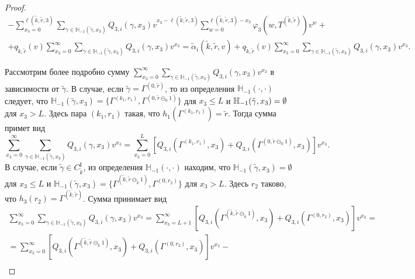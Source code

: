 \documentclass{report}
\begin{document}
\begin{proof}
\begin{multline}
-\sum_{x_3=0}^{\ell(\tilde{k},\tilde{r},3)}  \sum_{\gamma \in {\mathbb H}_{-1}(\tilde{\gamma},x_3)} Q_{3,i}(\gamma,x_3) v^{x_3-\ell(\tilde{k},\tilde{r},3)}   \sum_{w=0}^{\ell(\tilde{k},\tilde{r},3) -x_3}
\varphi_3(w,T^{(\tilde{k},\tilde{r})}) v^w   +\\
+ q_{\tilde{k},\tilde{r}}(v) \sum_{x_3=0}^{\infty} \sum_{\gamma \in {\mathbb H}_{-1}(\tilde{\gamma},x_3)} Q_{3,i}(\gamma,x_3) v^{x_3} = \tilde{\alpha}_i(\tilde{k},\tilde{r},v) + q_{\tilde{k},\tilde{r}}(v) \sum_{x_3=0}^{\infty} \sum_{\gamma \in {\mathbb H}_{-1}(\tilde{\gamma},x_3)} Q_{3,i}(\gamma,x_3) v^{x_3}.
\label{rekur:general:second}
\end{multline}

Рассмотрим более подробно сумму $\sum_{x_3=0}^{\infty} \sum_{\gamma \in {\mathbb H}_{-1}(\tilde{\gamma},x_3)} Q_{3,i}(\gamma,x_3) v^{x_3}$ в зависимости от $\tilde{\gamma}$.
В случае, если $\tilde{\gamma} = \Gamma^{(0,\tilde{r})}$, то из определения ${\mathbb H}_{-1}(\cdot,\cdot)$ следует, что ${\mathbb H}_{-1}(\tilde{\gamma},x_3) = \{\Gamma^{(k_1,r_1)}, \Gamma^{(0,\tilde{r}\ominus_0 1)}\}$ для $x_3 \leqslant L$ и
${\mathbb H}_{-1}(\tilde{\gamma},x_3) \hm=\emptyset$ для $x_3 > L$. Здесь пара $(k_1,r_1)$ такая, что $h_1(\Gamma^{(k_1,r_1)}) = \tilde{r}$. Тогда сумма примет вид
\begin{equation}
\sum_{x_3=0}^{\infty} \sum_{\gamma \in {\mathbb H}_{-1}(\tilde{\gamma},x_3)} Q_{3,i}(\gamma,x_3) v^{x_3} = \sum_{x_3=0}^{L} \left[ Q_{3,i}(\Gamma^{(k_1,r_1)},x_3) + Q_{3,i}(\Gamma^{(0,\tilde{r}\ominus_0 1)},x_3) \right] v^{x_3}.
\label{rekur:additional:first}
\end{equation}
В случае, если $\tilde{\gamma} \in C_{\tilde{k}}^{\mathrm{I}}$, из определения  ${\mathbb H}_{-1}(\cdot,\cdot)$ находим, что ${\mathbb H}_{-1}(\tilde{\gamma},x_3) = \emptyset$ для $x_3 \leqslant L$ и ${\mathbb H}_{-1}(\tilde{\gamma},x_3) = \{\Gamma^{(\tilde{k},\tilde{r}\ominus_{\tilde{k}} 1)}, \Gamma^{(0,r_2)}\}$ для $x_3 > L$. Здесь $r_2$ таково, что $h_3(r_2)=\Gamma^{(\tilde{k},\tilde{r})}$. Сумма принимает вид
\begin{multline}
\sum_{x_3=0}^{\infty} \sum_{\gamma \in {\mathbb H}_{-1}(\tilde{\gamma},x_3)} Q_{3,i}(\gamma,x_3) v^{x_3} = \sum_{x_3=L+1}^{\infty} \left[ Q_{3,i}(\Gamma^{(\tilde{k},\tilde{r}\ominus_{\tilde{k}} 1)},x_3) + Q_{3,i}(\Gamma^{(0,r_2)},x_3) \right] v^{x_3} = \\=
\sum_{x_3=0}^{\infty} \left[ Q_{3,i}(\Gamma^{(\tilde{k},\tilde{r}\ominus_{\tilde{k}} 1)},x_3) + Q_{3,i}(\Gamma^{(0,r_2)},x_3) \right] v^{x_3} -\\

\end{multline}
\end{proof}
\end{document}
